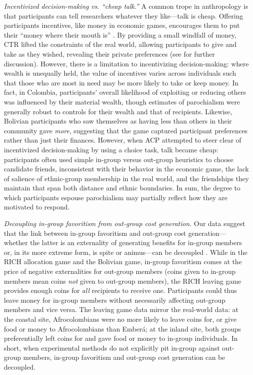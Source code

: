 \documentclass[bibauthoryear]{aa}
\begin{document}
\emph{Incentivized decision-making vs. ``cheap talk.''} A common trope in anthropology is that participants can tell researchers whatever they like---talk is cheap. Offering participants incentives, like money in economic games, encourages them to put their ``money where their mouth is'' \citep{xygalatasreligious, gurven2008collective, Pisor2020}. By providing a small windfall of money, CTR lifted the constraints of the real world, allowing participants to give and take as they wished, revealing their private preferences (see \citet{Pisor2020} for further discussion). However, there is a limitation to incentivizing decision-making: where wealth is unequally held, the value of incentives varies across individuals such that those who are most in need may be more likely to take or keep money. In fact, in Colombia, participants' overall likelihood of exploiting or reducing others was influenced by their material wealth, though estimates of parochialism were generally robust to controls for their wealth and that of recipients. Likewise, Bolivian participants who saw themselves as having less than others in their community gave \emph{more}, suggesting that the game captured participant preferences rather than just their finances. However, when ACP attempted to steer clear of incentivized decision-making by using a choice task, talk became cheap: participants often used simple in-group versus out-group heuristics to choose candidate friends, inconsistent with their behavior in the economic game, the lack of salience of ethnic-group membership in the real world, and the friendships they maintain that span both distance and ethnic boundaries. In sum, the degree to which participants espouse parochialism may partially reflect how they are motivated to respond.

\emph{Decoupling in-group favoritism from out-group cost generation.} Our data suggest that the link between in-group favoritism and out-group cost generation---whether the latter is an externality of generating benefits for in-group members or, in its more extreme form, is spite or animus---can be decoupled \citep[see also][]{cashdan2001ethnocentrism, hruschka2013economic, schaub2017threat, yamagishi2016parochial}. While in the RICH allocation game and the Bolivian game, in-group favoritism comes at the price of negative externalities for out-group members (coins given to in-group members mean coins \emph{not} given to out-group members), the RICH leaving game provides enough coins for \emph{all} recipients to receive one. Participants could thus leave money for in-group members without necessarily affecting out-group members and vice versa. The leaving game data mirror the real-world data: at the coastal site, Afrocolombians were no more likely to leave coins for, or give food or money to Afrocolombians than Ember\'a; at the inland site, both groups preferentially left coins for and gave food or money to in-group individuals. In short, when experimental methods do not explicitly pit in-group against out-group members, in-group favoritism and out-group cost generation can be decoupled.
\end{document}
